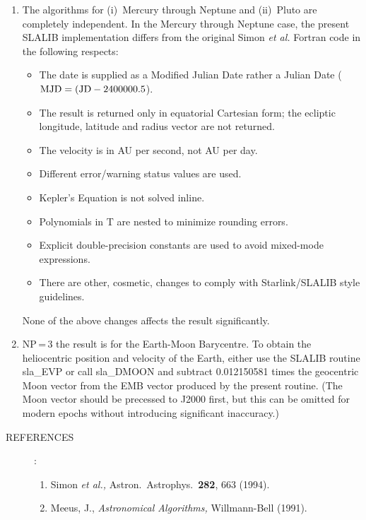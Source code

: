 \documentclass[11pt,twoside]{article}
\newlength{\oldspacing}
\newcommand{\refs}[1]
{
  \goodbreak
  \setlength{\oldspacing}{\topsep}
  \setlength{\topsep}{0.3ex}
  \begin{description}
    \item[REFERENCES]:
        #1
  \end{description}
  \setlength{\topsep}{\oldspacing}
}
\newcommand{\refs}[1]
   {
     \begin{description}
       \item[REFERENCES:]
           #1
     \end{description}
   }
\begin{document}
{\begin{enumerate}
        For all except Pluto, over the period 1000-3000,
        the accuracy is better than 1.5
        times that over 1800-2200.  Outside the interval 1000-3000 the
        accuracy declines.  For Pluto the accuracy declines rapidly
        outside the period 1885-2099.  Outside these ranges
        (1885-2099 for Pluto, 1000-3000 for the rest) a ``date out
        of range'' warning status ({\tt JSTAT=+1}) is returned.
  \item The algorithms for (i)~Mercury through Neptune and
        (ii)~Pluto are completely independent.  In the Mercury
        through Neptune case, the present SLALIB
        implementation differs from the original
        Simon {\it et al.}\/ Fortran code in the following respects:
        \begin{itemize}
         \item The date is supplied as a Modified Julian Date rather
               a Julian Date (${\rm MJD} = ({\rm JD} - 2400000.5$).
         \item The result is returned only in equatorial
               Cartesian form;  the ecliptic
               longitude, latitude and radius vector are not returned.
         \item The velocity is in AU per second, not AU per day.
         \item Different error/warning status values are used.
         \item Kepler's Equation is not solved inline.
         \item Polynomials in T are nested to minimize rounding errors.
         \item Explicit double-precision constants are used to avoid
               mixed-mode expressions.
         \item There are other, cosmetic, changes to comply with
               Starlink/SLALIB style guidelines.
        \end{itemize}
        None of the above changes affects the result significantly.
  \item NP\,=\,3 the result is for the Earth-Moon Barycentre.  To
        obtain the heliocentric position and velocity of the Earth,
        either use the SLALIB routine sla\_EVP or call sla\_DMOON and
        subtract 0.012150581 times the geocentric Moon vector from
        the EMB vector produced by the present routine.  (The Moon
        vector should be precessed to J2000 first, but this can
        be omitted for modern epochs without introducing significant
        inaccuracy.)
 \end{enumerate}
\refs
{
 \begin{enumerate}
  \item Simon {\it et al.,}\/
        Astron.\ Astrophys.\ {\bf 282}, 663 (1994).
  \item Meeus, J.,
        {\it Astronomical Algorithms,}\/ Willmann-Bell (1991).
 \end{enumerate}
}
}
\end{document}

